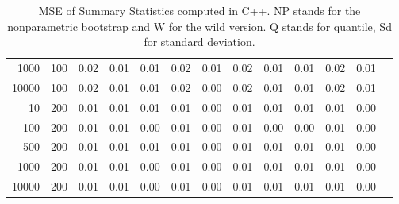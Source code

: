 \begin{table}[ht]
\begin{tabular}{rrrrrrrrrrrrr}
  1000 & 100 & 0.02 & 0.01 & 0.01 & 0.02 & 0.01 & 0.02 & 0.01 & 0.01 & 0.02 & 0.01 \\ 
  10000 & 100 & 0.02 & 0.01 & 0.01 & 0.02 & 0.00 & 0.02 & 0.01 & 0.01 & 0.02 & 0.01 \\ 
  10 & 200 & 0.01 & 0.01 & 0.01 & 0.01 & 0.00 & 0.01 & 0.01 & 0.01 & 0.01 & 0.00 \\ 
  100 & 200 & 0.01 & 0.01 & 0.00 & 0.01 & 0.00 & 0.01 & 0.00 & 0.00 & 0.01 & 0.00 \\ 
  500 & 200 & 0.01 & 0.01 & 0.01 & 0.01 & 0.00 & 0.01 & 0.01 & 0.01 & 0.01 & 0.00 \\ 
  1000 & 200 & 0.01 & 0.01 & 0.00 & 0.01 & 0.00 & 0.01 & 0.01 & 0.01 & 0.01 & 0.00 \\ 
  10000 & 200 & 0.01 & 0.01 & 0.00 & 0.01 & 0.00 & 0.01 & 0.01 & 0.01 & 0.01 & 0.00 \\ 
   \hline
\end{tabular}
\caption[MSE of Summary Statistics C++]{MSE of Summary Statistics computed in C++. NP stands for the nonparametric bootstrap and W for the wild version. Q stands for quantile, Sd for standard deviation.}
\label{tab:sum_mse_cpp}
\end{table}

